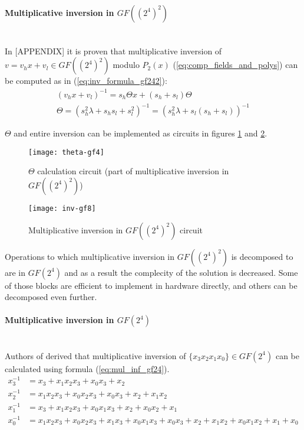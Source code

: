 \paragraph{Multiplicative inversion in $GF((2^4)^2)$}\mbox{}\\
In \cite{vlsi}[APPENDIX] it is proven that multiplicative inversion of $v = v_hx + v_l \in GF((2^4)^2)$ modulo $P_2(x)$ (\ref{eq:comp_fields_and_polys}) can be computed as in (\ref{eq:inv_formula_gf242}):
\begin{equation}
\begin{gathered}
\label{eq:inv_formula_gf242}
(v_hx + v_l)^{-1} = s_h \Theta x + (s_h + s_l) \Theta\\
\Theta = (s_h^2 \lambda + s_hs_l + s_l^2)^{-1} = (s_h^2 \lambda + s_l (s_h + s_l))^{-1}
\end{gathered}
\end{equation}

$\Theta$ and entire inversion can be implemented as circuits in figures \ref{fig:theta_impl} and \ref{fig:mul_inv_gf242}.

\begin{figure}[!h]
\centering
\texttt{[image: theta-gf4]}
\caption{$\Theta$ calculation circuit (part of multiplicative inversion in $GF((2^4)^2)$)}
\label{fig:theta_impl}
\end{figure}

\begin{figure}[!h]
\centering
\texttt{[image: inv-gf8]}
\caption{Multiplicative inversion in $GF((2^4)^2)$ circuit}
\label{fig:mul_inv_gf242}
\end{figure}

Operations to which multiplicative inversion in $GF((2^4)^2)$ is decomposed to are in $GF(2^4)$ and as a result the complecity of the solution is decreased. Some of those blocks are efficient to implement in hardware directly, and others can be decomposed even further.




\paragraph{Multiplicative inversion in $GF(2^4)$}\mbox{}\\
Authors of \cite{vlsi} derived that multiplicative inversion of $\{x_3x_2x_1x_0\} \in GF(2^4)$ can be calculated using formula (\ref{eq:mul_inf_gf24}).
\begin{equation}
\label{eq:mul_inf_gf24}
\begin{aligned}
x_3^{-1} &= x_3 + x_1x_2x_3 + x_0x_3 + x_2\\
x_2^{-1} &= x_1x_2x_3 + x_0x_2x_3 + x_0x_3 + x_2 + x_1x_2\\
x_1^{-1} &= x_3 + x_1x_2x_3 + x_0x_1x_3 + x_2 + x_0x_2 + x_1\\
x_0^{-1} &= x_1x_2x_3 + x_0x_2x_3 + x_1x_3 + x_0x_1x_3 + x_0x_3 + x_2 + x_1x_2 + x_0x_1x_2 + x_1 + x_0
\end{aligned}
\end{equation}


